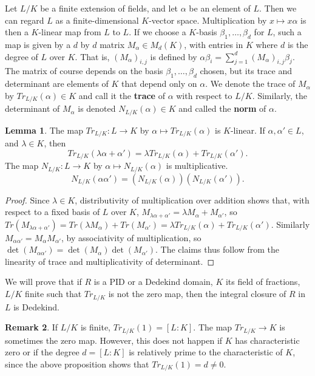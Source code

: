 \documentclass{article}
\newcommand{\rb}[1]{\left( #1 \right)}
\renewcommand{\sb}[1]{\left[ #1 \right]}
\theoremstyle{definition}\newtheorem{definition}{Definition}[subsection]
\theoremstyle{definition}\newtheorem{remark}[definition]{Remark}
\theoremstyle{definition}\newtheorem*{example}{Example}
\theoremstyle{definition}\newtheorem*{note}{Note}
\newtheorem{lemma}[definition]{Lemma}
\begin{document}
Let $ L / K $ be a finite extension of fields, and let $ \alpha $ be an element of $ L $. Then we can regard $ L $ as a finite-dimensional $ K $-vector space. Multiplication by $ x \mapsto x\alpha $ is then a $ K $-linear map from $ L $ to $ L $. If we choose a $ K $-basis $ \beta_1, \dots, \beta_d $ for $ L $, such a map is given by a $ d $ by $ d $ matrix $ M_\alpha \in M_d\rb{K} $, with entries in $ K $ where $ d $ is the degree of $ L $ over $ K $. That is, $ \rb{M_\alpha}_{i, j} $ is defined by $ \alpha\beta_i = \sum_{j = 1}^d \rb{M_\alpha}_{i, j}\beta_j $. The matrix of course depends on the basis $ \beta_1, \dots, \beta_d $ chosen, but its trace and determinant are elements of $ K $ that depend only on $ \alpha $. We denote the trace of $ M_\alpha $ by $ Tr_{L / K}\rb{\alpha} \in K $ and call it the \textbf{trace} of $ \alpha $ with respect to $ L / K $. Similarly, the determinant of $ M_\alpha $ is denoted $ N_{L / K}\rb{\alpha} \in K $ and called the \textbf{norm} of $ \alpha $.

\begin{lemma}
The map $ Tr_{L / K} : L \to K $ by $ \alpha \mapsto Tr_{L / K}\rb{\alpha} $ is $ K $-linear. If $ \alpha, \alpha' \in L $, and $ \lambda \in K $, then
$$ Tr_{L / K}\rb{\lambda\alpha + \alpha'} = \lambda Tr_{L / K}\rb{\alpha} + Tr_{L / K}\rb{\alpha'}. $$
The map $ N_{L / K} : L \to K $ by $ \alpha \mapsto N_{L / K}\rb{\alpha} $ is multiplicative.
$$ N_{L / K}\rb{\alpha\alpha'} = \rb{N_{L / K}\rb{\alpha}}\rb{N_{L / K}\rb{\alpha'}}. $$
\end{lemma}

\begin{proof}
Since $ \lambda \in K $, distributivity of multiplication over addition shows that, with respect to a fixed basis of $ L $ over $ K $, $ M_{\lambda\alpha + \alpha'} = \lambda M_\alpha + M_{\alpha'} $, so $ Tr\rb{M_{\lambda\alpha + \alpha'}} = Tr\rb{\lambda M_\alpha} + Tr\rb{M_{\alpha'}} = \lambda Tr_{L / K}\rb{\alpha} + Tr_{L / K}\rb{\alpha'} $. Similarly $ M_{\alpha\alpha'} = M_\alpha M_{\alpha'} $, by associativity of multiplication, so $ \det\rb{M_{\alpha\alpha'}} = \det\rb{M_\alpha}\det\rb{M_{\alpha'}} $. The claims thus follow from the linearity of trace and multiplicativity of determinant.
\end{proof}

We will prove that if $ R $ is a PID or a Dedekind domain, $ K $ its field of fractions, $ L / K $ finite such that $ Tr_{L / K} $ is not the zero map, then the integral closure of $ R $ in $ L $ is Dedekind.

\begin{remark}
If $ L / K $ is finite, $ Tr_{L / K}\rb{1} = \sb{L : K} $. The map $ Tr_{L / K} \to K $ is sometimes the zero map. However, this does not happen if $ K $ has characteristic zero or if the degree $ d = \sb{L : K} $ is relatively prime to the characteristic of $ K $, since the above proposition shows that $ Tr_{L / K}\rb{1} = d \ne 0 $.
\end{remark}
\end{document}
